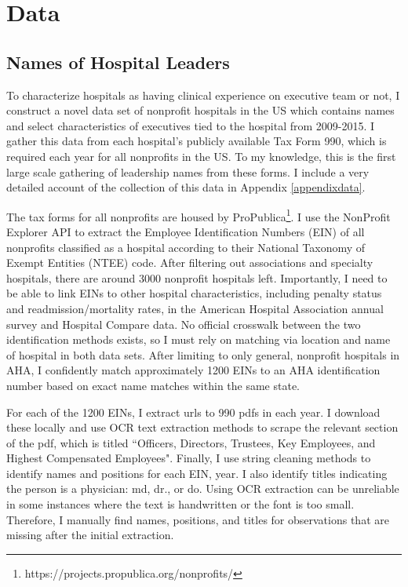 \documentclass[12pt]{article}
\begin{document}
  
	
	\section{Data}

    \subsection{Names of Hospital Leaders}

    To characterize hospitals as having clinical experience on executive team or not, I construct a novel data set of nonprofit hospitals in the US which contains names and select characteristics of executives tied to the hospital from 2009-2015. I gather this data from each hospital's publicly available Tax Form 990, which is required each year for all nonprofits in the US. To my knowledge, this is the first large scale gathering of leadership names from these forms. I include a very detailed account of the collection of this data in Appendix \ref{appendixdata}.

    The tax forms for all nonprofits are housed by ProPublica\footnote{https://projects.propublica.org/nonprofits/}. I use the NonProfit Explorer API to extract the Employee Identification Numbers (EIN) of all nonprofits classified as a hospital according to their National Taxonomy of Exempt Entities (NTEE) code. After filtering out associations and specialty hospitals, there are around 3000 nonprofit hospitals left. Importantly, I need to be able to link EINs to other hospital characteristics, including penalty status and readmission/mortality rates, in the American Hospital Association annual survey and Hospital Compare data. No official crosswalk between the two identification methods exists, so I must rely on matching via location and name of hospital in both data sets. After limiting to only general, nonprofit hospitals in AHA, I confidently match approximately 1200 EINs to an AHA identification number based on exact name matches within the same state. 
    
    For each of the 1200 EINs, I extract urls to 990 pdfs in each year. I download these locally and use OCR text extraction methods to scrape the relevant section of the pdf, which is titled ``Officers, Directors, Trustees, Key Employees, and Highest Compensated Employees". Finally, I use string cleaning methods to identify names and positions for each EIN, year. I also identify titles indicating the person is a physician: md, dr., or do. Using OCR extraction can be unreliable in some instances where the text is handwritten or the font is too small. Therefore, I manually find names, positions, and titles for observations that are missing after the initial extraction.
\end{document}
